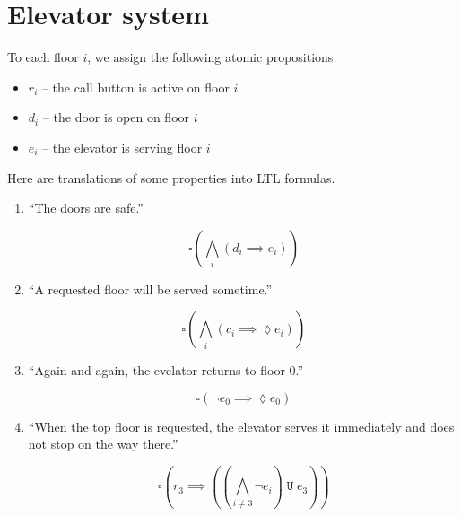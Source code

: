 \documentclass[letterpaper,11pt]{article}
\newcommand{\question}{\section}
\newcommand{\eventually}{\lozenge}
\newcommand{\always}{\square}
\DeclareMathOperator{\untilOp}{\mathtt{U}}
\newcommand{\until}{\untilOp{}}
\newcommand{\Land}{\bigwedge}
\newcommand{\parens}[1]{\left(#1\right)}
\begin{document}
\question{Elevator system}

To each floor $i$, we assign the following atomic propositions.
\begin{itemize}
    \item $r_i$ -- the call button is active on floor $i$
    \item $d_i$ -- the door is open on floor $i$
    \item $e_i$ -- the elevator is serving floor $i$
\end{itemize}

Here are translations of some properties into LTL formulas.

\begin{enumerate}
    \item ``The doors are safe.''

        \begin{equation*}
            \always\parens{\Land_i \parens{d_i \implies e_i}}
        \end{equation*}

    \item ``A requested floor will be served sometime.''

        \begin{equation*}
            \always\parens{
                \Land_i \parens{
                    c_i \implies \eventually e_i
                }
            }
        \end{equation*}

    \item ``Again and again, the evelator returns to floor 0.''

        \begin{equation*}
            \always\parens{
                \neg e_0 \implies \eventually e_0
            }
        \end{equation*}

    \item ``When the top floor is requested, the elevator serves it immediately
        and does not stop on the way there.''

        \begin{equation*}
            \always\parens{
                r_3 \implies \parens{
                    \parens{
                        \Land_{i \neq 3} \neg e_i
                    }
                    \until
                    e_3
                }
            }
        \end{equation*}
\end{enumerate}
\end{document}
